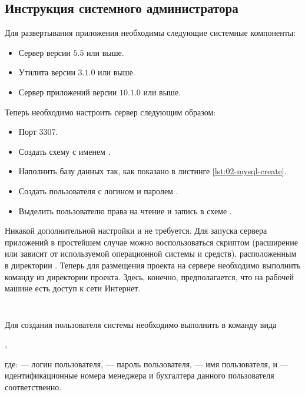 \subsection{Инструкция системного администратора}

Для развертывания приложения необходимы следующие системные компоненты:
\begin{itemize}
    \item Сервер  версии $5.5$ или выше.
    \item Утилита  версии $3.1.0$ или выше.
    \item Сервер приложений  версии $10.1.0$ или выше.
\end{itemize}
Теперь необходимо настроить  сервер следующим образом:
\begin{itemize}
    \item Порт $3307$.
    \item Создать схему с именем .
    \item Наполнить базу данных так, как показано в листинге \ref{lst:02-mysql-create}. 
    \item Создать пользователя с логином  и паролем .
    \item Выделить пользователю  права на чтение и запись в схеме .
\end{itemize}
Никакой дополнительной настройки  и  не требуется. Для запуска сервера приложений в простейшем случае можно
воспользоваться скриптом  (расширение  или  зависит от используемой операционной системы и средств),
расположенным в директории . Теперь для размещения проекта на сервере необходимо выполнить команду  из директории проекта. Здесь, конечно, предполагается, что на рабочей машине есть доступ к сети Интернет.

\begin{center}
    \inputminted[lastline=34]{sql}{resources/02_implementation/07_mysql_create}
    \inputminted[firstline=35]{sql}{resources/02_implementation/07_mysql_create}
\end{center}

Для создания пользователя системы необходимо выполнить в  команду вида
\begin{center}
    ,
\end{center}
где:  --- логин пользователя,  --- пароль пользователя,  --- имя пользователя,  и 
 --- идентификационные номера менеджера и бухгалтера данного пользователя соответственно. 

